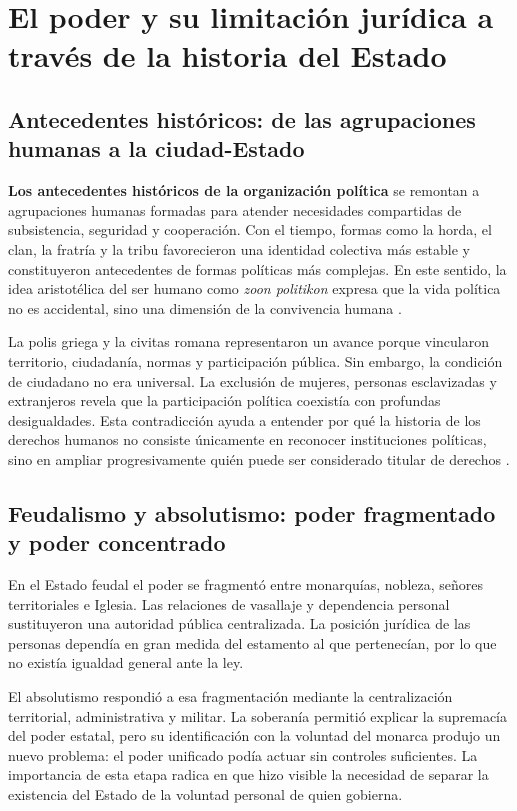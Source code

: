 \documentclass[
  spanish,
  letterpaper, oneside
]{article}
\begin{document}
\section{El poder y su limitación jurídica a través de la historia del Estado}

\subsection{Antecedentes históricos: de las agrupaciones humanas a la ciudad-Estado}

\textbf{Los antecedentes históricos de la organización política} se remontan a agrupaciones humanas formadas para atender necesidades compartidas de subsistencia, seguridad y cooperación. Con el tiempo, formas como la horda, el clan, la fratría y la tribu favorecieron una identidad colectiva más estable y constituyeron antecedentes de formas políticas más complejas. En este sentido, la idea aristotélica del ser humano como \textit{zoon politikon} expresa que la vida política no es accidental, sino una dimensión de la convivencia humana \citep{notaEstadoHistoria2026}.

La polis griega y la civitas romana representaron un avance porque vincularon territorio, ciudadanía, normas y participación pública. Sin embargo, la condición de ciudadano no era universal. La exclusión de mujeres, personas esclavizadas y extranjeros revela que la participación política coexistía con profundas desigualdades. Esta contradicción ayuda a entender por qué la historia de los derechos humanos no consiste únicamente en reconocer instituciones políticas, sino en ampliar progresivamente quién puede ser considerado titular de derechos \citep{rabinovichBerkmanDerechosHumanos}.

\subsection{Feudalismo y absolutismo: poder fragmentado y poder concentrado}

En el Estado feudal el poder se fragmentó entre monarquías, nobleza, señores territoriales e Iglesia. Las relaciones de vasallaje y dependencia personal sustituyeron una autoridad pública centralizada. La posición jurídica de las personas dependía en gran medida del estamento al que pertenecían, por lo que no existía igualdad general ante la ley.

El absolutismo respondió a esa fragmentación mediante la centralización territorial, administrativa y militar. La soberanía permitió explicar la supremacía del poder estatal, pero su identificación con la voluntad del monarca produjo un nuevo problema: el poder unificado podía actuar sin controles suficientes. La importancia de esta etapa radica en que hizo visible la necesidad de separar la existencia del Estado de la voluntad personal de quien gobierna.
\end{document}

